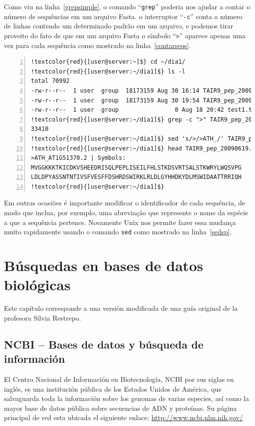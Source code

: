 \documentclass[letter,11pt]{book}
\begin{document}
Como viu na linha~\ref{grepsimple}, o comando ``\Verb+grep+'' poderia nos ajudar a contar o número de sequências em um arquivo Fasta. o interruptor ``\Verb+-c+'' conta o número de linhas contendo um determinado padrão em um arquivo, e podemos tirar proveito do fato de que em um arquivo Fasta o símbolo ``\Verb+>+'' aparece apenas uma vez para cada sequência como mostrado na linha~\ref{contarseqs}.

\begin{Verbatim}[commandchars=!\{\},numbers=left,firstnumber=last,label=Usando comandos Unix com arquivos Fasta,frame=topline,fontsize=\scriptsize]
!textcolor{red}{[user@server:~]$} cd ~/dia1/
!textcolor{red}{[user@server:~/dia1]$} ls -l
total 70992
-rw-r--r--  1 user  group  18173159 Aug 30 16:14 TAIR9_pep_20090619
-rw-r--r--  1 user  group  18173159 Aug 30 19:54 TAIR9_pep_20090619.lc
-rw-r--r--  1 user  group                0 Aug 18 20:42 test1.txt
!textcolor{red}{[user@server:~/dia1]$} grep -c ">" TAIR9_pep_20090619 !label{contarseqs}
33410
!textcolor{red}{[user@server:~/dia1]$} sed 's/>/>ATH_/' TAIR9_pep_20090619 > TAIR9_pep_20090619.mod !label{sedsp}
!textcolor{red}{[user@server:~/dia1]$} head TAIR9_pep_20090619.mod
>ATH_AT1G51370.2 | Symbols: 
MVGGKKKTKICDKVSHEEDRISQLPEPLISEILFHLSTKDSVRTSALSTKWRYLWQSVPG
LDLDPYASSNTNTIVSFVESFFDSHRDSWIRKLRLDLGYHHDKYDLMSWIDAATTRRIQH
!textcolor{red}{[user@server:~/dia1]$}
\end{Verbatim} 

Em outras ocasiões é importante modificar o identificador de cada sequência, de modo que inclua, por exemplo, uma abreviação que represente o nome da espécie a que a sequência pertence. Novamente Unix nos permite fazer essa mudança muito rapidamente usando o comando \Verb+sed+ como mostrado na linha~\ref{sedsp}.

\chapter{Búsquedas en bases de datos biológicas}

Este capítulo corresponde a una versión modificada de una guía original de la profesora Silvia Restrepo.

\section{NCBI – Bases de datos y búsqueda de información}

El Centro Nacional de Información en Biotecnología, NCBI por sus siglas en inglés, es una institución pública de los Estados Unidos de América, que salvaguarda toda la información sobre los genomas de varias especies, así como la mayor base de datos pública sobre secuencias de ADN y proteínas.  Su página principal de red esta ubicada el siguiente enlace: \url{http://www.ncbi.nlm.nih.gov/}
\end{document}
